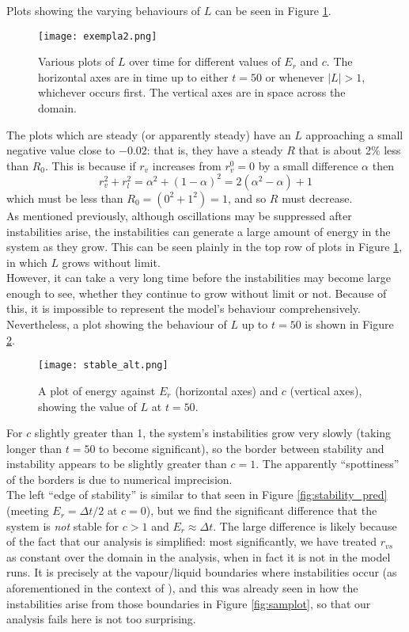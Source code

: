 \documentclass[11pt]{article}
\begin{document}
Plots showing the varying behaviours of $L$ can be seen in Figure \ref{fig:exempla2}.
\begin{figure}[H]
\centering
\texttt{[image: exempla2.png]}
\caption{Various plots of $L$ over time for different values of $E_r$ and $c$. The horizontal axes are in time up to either $t=50$ or whenever $|L|>1$, whichever occurs first. The vertical axes are in space across the domain.}
\label{fig:exempla2}
\end{figure}
The plots which are steady (or apparently steady) have an $L$ approaching a small negative value close to $-0.02$: that is, they have a steady $R$ that is about 2\% less than $R_0$. This is because if $r_v$ increases from $r^0_v=0$ by a small difference $\alpha$ then
\begin{equation} \label{eq:re_change}
r_v^2 + r_l^2 = \alpha^2 + (1-\alpha)^2 = 2\left(\alpha^2 - \alpha\right) + 1
\end{equation}
which must be less than $R_0 = (0^2 + 1^2) = 1$, and so $R$ must decrease. \\
As mentioned previously, although oscillations may be suppressed after instabilities arise, the instabilities can generate a large amount of energy in the system as they grow. This can be seen plainly in the top row of plots in Figure \ref{fig:exempla2}, in which $L$ grows without limit. \\
However, it can take a very long time before the instabilities may become large enough to see, whether they continue to grow without limit or not. Because of this, it is impossible to represent the model's behaviour comprehensively. Nevertheless, a plot showing the behaviour of $L$ up to $t=50$ is shown in Figure \ref{fig:stable_alt}.
\begin{figure}[H]
\centering
\texttt{[image: stable\_alt.png]}
\caption{A plot of energy against $E_r$ (horizontal axes) and $c$ (vertical axes), showing the value of $L$ at $t=50$.}
\label{fig:stable_alt}
\end{figure}
For $c$ slightly greater than 1, the system's instabilities grow very slowly (taking longer than $t=50$ to become significant), so the border between stability and instability appears to be slightly greater than $c=1$. The apparently ``spottiness'' of the borders is due to numerical imprecision. \\
The left ``edge of stability'' is similar to that seen in Figure \ref{fig:stability_pred} (meeting $E_r=\Delta t/2$ at $c=0$), but we find the significant difference that the system is \emph{not} stable for $c>1$ and $E_r\approx\Delta t$. The large difference is likely because of the fact that our analysis is simplified: most significantly, we have treated $r_{vs}$ as constant over the domain in the analysis, when in fact it is not in the model runs. It is precisely at the vapour/liquid boundaries where instabilities occur (as aforementioned in the context of \citet{GS1990}), and this was already seen in how the instabilities arise from those boundaries in Figure \ref{fig:samplot}, so that our analysis fails here is not too surprising.
\end{document}
